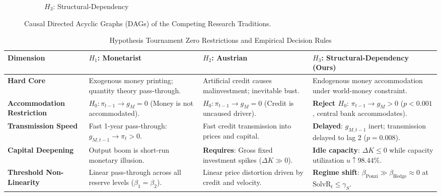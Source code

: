 \begin{figure}[H]
\begin{subfigure}[b]{0.34\textwidth}
\caption{$H_3$: Structural-Dependency}
\end{subfigure}
\caption{Causal Directed Acyclic Graphs (DAGs) of the Competing Research Traditions.}
\label{fig:causal_dags}
\end{figure}

\begin{table}[H]
\centering
\small
\caption{Hypothesis Tournament Zero Restrictions and Empirical Decision Rules}
\label{tab:tournament_restrictions}
\begin{tabular}{p{3.2cm}p{3.8cm}p{3.8cm}p{3.8cm}}
\toprule
\textbf{Dimension} & \textbf{$H_1$: Monetarist \citep{Edwards2024}} & \textbf{$H_2$: Austrian \citep{EspinosaVejar2025}} & \textbf{$H_3$: Structural-Dependency (Ours)} \\
\midrule
\textbf{Hard Core} & Exogenous money printing; quantity theory pass-through. & Artificial credit causes malinvestment; inevitable bust. & Endogenous money accommodation under world-money constraint. \\
\textbf{Accommodation Restriction} & $H_0: \pi_{t-1} \to g_M = 0$ (Money is not accommodated). & $H_0: \pi_{t-1} \to g_M = 0$ (Credit is uncaused driver). & \textbf{Reject $H_0$}: $\pi_{t-1} \to g_M > 0$ ($p < 0.001$, central bank accommodates). \\
\textbf{Transmission Speed} & Fast 1-year pass-through: $g_{M,t-1} \to \pi_t > 0$. & Fast credit transmission into prices and capital. & \textbf{Delayed}: $g_{M,t-1}$ inert; transmission delayed to lag 2 ($p = 0.008$). \\
\textbf{Capital Deepening} & Output boom is short-run monetary illusion. & \textbf{Requires}: Gross fixed investment spikes ($\Delta K \gg 0$). & \textbf{Idle capacity}: $\Delta K \le 0$ while capacity utilization $u \uparrow 98.44\%$. \\
\textbf{Threshold Non-Linearity} & Linear pass-through across all reserve levels ($\beta_1 = \beta_2$). & Linear price distortion driven by credit and velocity. & \textbf{Regime shift}: $\beta_{\text{Ponzi}} \gg \beta_{\text{Hedge}} \approx 0$ at $\text{SolvR}_t \le \gamma_S$. \\
\bottomrule
\end{tabular}
\end{table}

